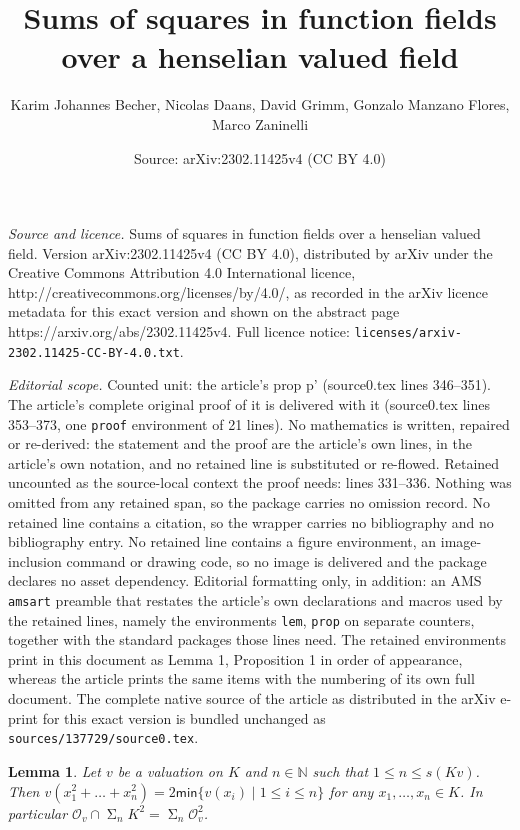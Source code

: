 \documentclass[10pt,a4paper]{amsart}
\title{Sums of squares in function fields over a henselian valued field}
\author{Karim Johannes Becher, Nicolas Daans, David Grimm, Gonzalo Manzano Flores, Marco Zaninelli}
\date{Source: arXiv:2302.11425v4 (CC BY 4.0)}
\newtheorem{lem}{Lemma}
\renewcommand{\leq}{\leqslant}
\newcommand{\mc}[1]{\mathcal{#1}}
\renewcommand{\min}{\mathsf{min}}
\newcommand{\nat}{\mathbb{N}}
\DeclareMathOperator{\newsum}{\mathsf{\Sigma}}
\newcommand{\sos}[2]{\sum_{#1}\!{#2}^2}
\renewcommand{\sum}{\newsum}
\begin{document}
\maketitle

\noindent\emph{Source and licence.} Sums of squares in function fields over a henselian valued field. Version arXiv:2302.11425v4 (CC BY 4.0), distributed by arXiv under the Creative Commons Attribution 4.0 International licence, http://creativecommons.org/licenses/by/4.0/, as recorded in the arXiv licence metadata for this exact version and shown on the abstract page https://arxiv.org/abs/2302.11425v4. Full licence notice: \texttt{licenses/arxiv-2302.11425-CC-BY-4.0.txt}.\par\smallskip

\noindent\textit{Editorial scope.} Counted unit: the article's prop p' (source0.tex lines 346--351). The article's complete original proof of it is delivered with it (source0.tex lines 353--373, one \texttt{proof} environment of 21 lines). No mathematics is written, repaired or re-derived: the statement and the proof are the article's own lines, in the article's own notation, and no retained line is substituted or re-flowed.  Retained uncounted as the source-local context the proof needs: lines 331--336.  Nothing was omitted from any retained span, so the package carries no omission record.  No retained line contains a citation, so the wrapper carries no bibliography and no bibliography entry.  No retained line contains a figure environment, an image-inclusion command or drawing code, so no image is delivered and the package declares no asset dependency.  Editorial formatting only, in addition: an AMS \texttt{amsart} preamble that restates the article's own declarations and macros used by the retained lines, namely the environments \texttt{lem}, \texttt{prop} on separate counters, together with the standard packages those lines need.  The retained environments print in this document as Lemma 1, Proposition 1 in order of appearance, whereas the article prints the same items with the numbering of its own full document.  The complete native source of the article as distributed in the arXiv e-print for this exact version is bundled unchanged as \texttt{sources/137729/source0.tex}.
\begin{lem}\label{L:valuation-residue-level}
Let $v$ be a valuation on $K$ and 
 $n\in\nat$ such that $1\leq n\leq s(Kv)$.
Then $v(x_1^2+\dots+x_n^2)=2\min\{v(x_i)\mid 1\leq i\leq n\}$ for any $x_1,\dots,x_n\in K$.
In particular $\mc{O}_v\cap\sos{n}{K}=\sos{n}{\mc{O}}_v$.
\end{lem}
\end{document}
